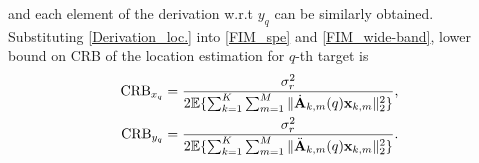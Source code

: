 \documentclass[9pt,final,journal,twocolumn]{IEEEtran}
\newtheorem{remark}{Remark}
\begin{document}
and each element of the derivation w.r.t $y_q$ can be similarly obtained. 
Substituting \eqref{Derivation_loc.} into \eqref{FIM_spe} and \eqref{FIM_wide-band}, lower bound on CRB of the location estimation for $q$-th target is 
\begin{subequations} \label{CRB_loc.q}
\begin{align}
 \mathrm{CRB}_{x_q}& = \frac{\sigma_r^2}{2\mathbb{E}\{\sum_{k=1}^K\sum_{m=1}^M\|\dot{\bf A}_{k,m}(q){\bf x}_{k,m}\|_2^2\}} ,    \\
 \mathrm{CRB}_{y_q}& = \frac{\sigma_r^2}{2\mathbb{E}\{\sum_{k=1}^K\sum_{m=1}^M\|\ddot{\bf A}_{k,m}(q){\bf x}_{k,m}\|_2^2\}}.
\end{align}
\end{subequations}



\end{document}
